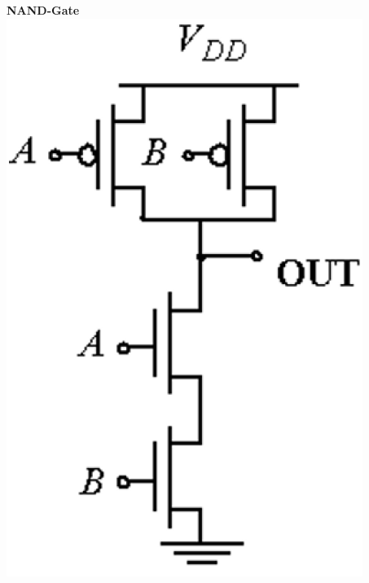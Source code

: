 \begin{minipage}[t]{0.27\columnwidth}
    \begin{center}
        \textbf{NAND-Gate} \\
    \includegraphics[width=\columnwidth]{images/cmos_nand_2.png}
    \end{center}
\end{minipage}
\hfill
